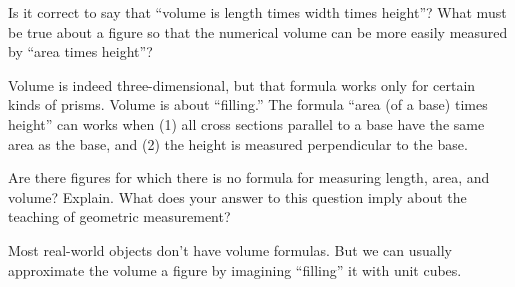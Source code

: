 \documentclass[nooutcomes]{ximera}
\begin{document}

\begin{problem}
 Is it correct to say that ``volume is length times width times height''? What must be true about a figure so that the numerical volume can be more easily measured by ``area times height''?
\begin{freeResponse}
\end{freeResponse}
\begin{hint}
Volume is indeed three-dimensional, but that formula works only for certain kinds of prisms.  Volume is about ``filling.''  The formula ``area (of a base) times height'' can works when (1) all cross sections parallel to a base have the same area as the base, and (2) the height is measured perpendicular to the base.   
\end{hint}
\end{problem}

\begin{problem}
Are there figures for which there is no formula for measuring length, area, and volume?  Explain.  What does your answer to this question imply about the teaching of geometric measurement?
\begin{freeResponse}
\end{freeResponse}
\begin{hint}
Most real-world objects don't have volume formulas.  But we can usually approximate the volume a figure by imagining ``filling'' it with unit cubes.  
\end{hint}
\end{problem}
\end{document}
